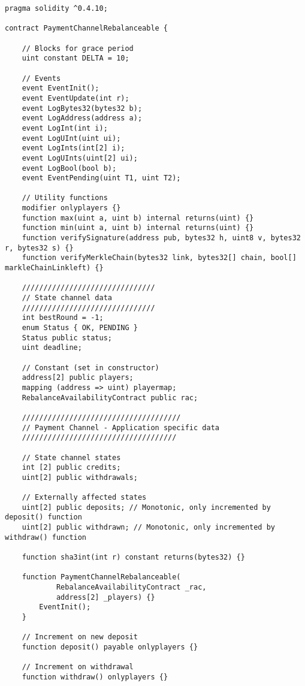 \documentclass[sigconf]{acmart}
\begin{document}
\begin{lstlisting}[linewidth=\columnwidth,breaklines=true, caption={Smart contract defined in channel.sol. Adapted from the Sprites payment channel in \cite{sprites}.}]
pragma solidity ^0.4.10;

contract PaymentChannelRebalanceable {

    // Blocks for grace period
    uint constant DELTA = 10;

    // Events
    event EventInit();
    event EventUpdate(int r);
    event LogBytes32(bytes32 b);
    event LogAddress(address a);
    event LogInt(int i);
    event LogUInt(uint ui);
    event LogInts(int[2] i);
    event LogUInts(uint[2] ui);
    event LogBool(bool b);
    event EventPending(uint T1, uint T2);

    // Utility functions
    modifier onlyplayers {}
    function max(uint a, uint b) internal returns(uint) {}
    function min(uint a, uint b) internal returns(uint) {}
    function verifySignature(address pub, bytes32 h, uint8 v, bytes32 r, bytes32 s) {}
    function verifyMerkleChain(bytes32 link, bytes32[] chain, bool[] markleChainLinkleft) {}

    ///////////////////////////////
    // State channel data
    ///////////////////////////////
    int bestRound = -1;
    enum Status { OK, PENDING }
    Status public status;
    uint deadline;

    // Constant (set in constructor)
    address[2] public players;
    mapping (address => uint) playermap;
    RebalanceAvailabilityContract public rac;

    /////////////////////////////////////
    // Payment Channel - Application specific data
    ////////////////////////////////////

    // State channel states
    int [2] public credits;
    uint[2] public withdrawals;

    // Externally affected states
    uint[2] public deposits; // Monotonic, only incremented by deposit() function
    uint[2] public withdrawn; // Monotonic, only incremented by withdraw() function

    function sha3int(int r) constant returns(bytes32) {}

    function PaymentChannelRebalanceable(
            RebalanceAvailabilityContract _rac,
            address[2] _players) {}
        EventInit();
    }

    // Increment on new deposit
    function deposit() payable onlyplayers {}

    // Increment on withdrawal
    function withdraw() onlyplayers {}


\end{lstlisting}
\end{document}
